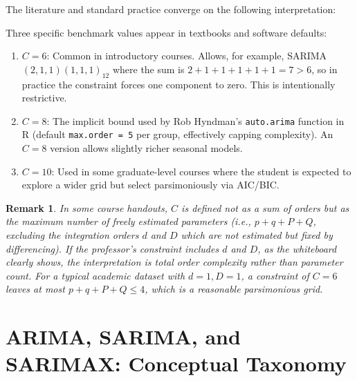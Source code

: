 \documentclass[12pt,a4paper]{article}
\newtheorem{remark}{Remark}[section]
\begin{document}
The literature and standard practice converge on the following interpretation:

\begin{center}
\end{center}

Three specific benchmark values appear in textbooks and software defaults:
\begin{enumerate}
  \item \textbf{$C = 6$}: Common in introductory courses. Allows, for example,
  SARIMA$(2,1,1)(1,1,1)_{12}$ where the sum is $2+1+1+1+1+1=7>6$, so in
  practice the constraint forces one component to zero. This is intentionally
  restrictive.
  \item \textbf{$C = 8$}: The implicit bound used by Rob Hyndman's \texttt{auto.arima}
  function in R (default \texttt{max.order = 5} per group, effectively capping
  complexity). An $C=8$ version allows slightly richer seasonal models.
  \item \textbf{$C = 10$}: Used in some graduate-level courses where the student
  is expected to explore a wider grid but select parsimoniously via AIC/BIC.
\end{enumerate}

\begin{remark}
In some course handouts, $C$ is defined not as a sum of orders but as the
maximum number of \emph{freely estimated} parameters (i.e., $p + q + P + Q$,
excluding the integration orders $d$ and $D$ which are not estimated but fixed
by differencing). If the professor's constraint includes $d$ and $D$, as the
whiteboard clearly shows, the interpretation is total order complexity rather
than parameter count. For a typical academic dataset with $d=1, D=1$, a constraint
of $C=6$ leaves at most $p+q+P+Q \le 4$, which is a reasonable parsimonious grid.
\end{remark}

\section{ARIMA, SARIMA, and SARIMAX: Conceptual Taxonomy}
\end{document}
